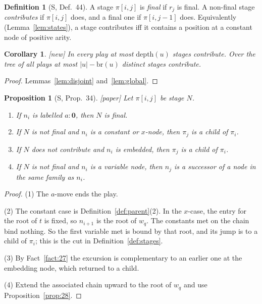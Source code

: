 \documentclass[11pt]{article}
\newcommand{\Ground}{\mathbf{0}}
\newcommand{\depth}{\mathrm{depth}}
\newcommand{\br}{\mathrm{br}}
\newcommand{\iv}[2]{\pi[#1,#2]}
\newcommand{\Paper}{\textsf{[paper]}}
\newcommand{\New}{\textsf{[new]}}
\theoremstyle{plain}
\newtheorem{proposition}[theorem]{Proposition}
\newtheorem{corollary}[theorem]{Corollary}
\theoremstyle{definition}
\newtheorem{definition}[theorem]{Definition}
\theoremstyle{remark}
\begin{document}
\begin{definition}[S, Def.~44]
A stage $\iv ij$ is \emph{final} if $r_j$ is final.  A non-final stage
\emph{contributes} if $\iv ij$ does, and a final one if $\iv i{j-1}$
does.  Equivalently (Lemma~\ref{lem:states}), a stage contributes iff
it contains a position at a constant node of positive arity.
\end{definition}

\begin{corollary}\label{cor:contrib-stages}
\New{} In every play at most $\depth(u)$ stages contribute.  Over the
tree of all plays at most $|u|-\br(u)$ distinct stages contribute.
\end{corollary}
\begin{proof}
Lemmas~\ref{lem:disjoint} and~\ref{lem:global}.
\end{proof}

\begin{proposition}[S, Prop.~34]\label{prop:34}
\Paper{} Let $\iv ij$ be stage $N$.
\begin{enumerate}
\item If $n_i$ is labelled $a:\Ground$, then $N$ is final.
\item If $N$ is not final and $n_i$ is a constant or $x$-node,
  then $\pi_j$ is a child of $\pi_i$.
\item If $N$ does not contribute and $n_i$ is embedded, then $\pi_j$ is a
  child of $\pi_i$.
\item If $N$ is not final and $n_i$ is a variable node, then $n_j$ is a
  successor of a node in the same family as $n_i$.
\end{enumerate}
\end{proposition}
\begin{proof}
(1) The $a$-move ends the play.

(2) The constant case is Definition~\ref{def:parent}(2).  In the
$x$-case, the entry for the root of $t$ is fixed, so $n_{i+1}$ is
the root of $w_q$.  The constants met on the chain bind nothing.  So the
first variable met is bound by that root, and its jump is to a child of
$\pi_i$; this is the cut in Definition~\ref{def:stages}.

(3) By Fact~\ref{fact:27} the excursion is complementary to an earlier
one at the embedding node, which returned to a child.

(4) Extend the associated chain upward to the root of $w_q$ and use
Proposition~\ref{prop:28}.
\end{proof}
\end{document}
